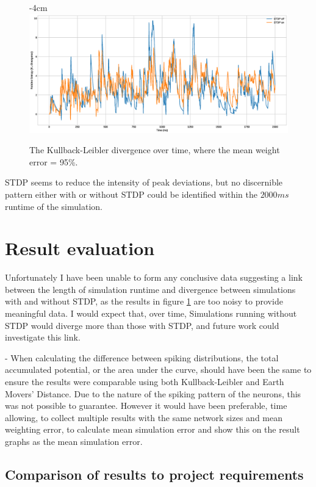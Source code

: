 \begin{figure}[h!]
    \centering
    \addtolength{\leftskip} {-4cm}
    \addtolength{\rightskip}{-4cm}
    \includegraphics[width=1.6\linewidth]{figures/graphs/RESULT2.eps}
    \caption[KL divergence over time, mean weight error = 95\%]{The Kullback-Leibler divergence over time, where the mean weight error = 95\%.}
    \label{fig:RES2}
\end{figure}
\FloatBarrier
STDP seems to reduce the intensity of peak deviations, but no discernible pattern either with or without STDP could be identified within the $2000ms$ runtime of the simulation.


\section{Result evaluation}

Unfortunately I have been unable to form any conclusive data suggesting a link
between the length of simulation runtime and divergence between simulations with
and without STDP, as the results in figure \ref{fig:RES2} are too noisy to
provide meaningful data. I would expect that, over time, Simulations running
without STDP would diverge more than those with STDP, and future work could
investigate this link.

- When calculating the difference between spiking distributions, the total
accumulated potential, or the area under
the curve, should have been the same to ensure
the results were comparable using both Kullback-Leibler and Earth Movers'
Distance. Due to the nature of the spiking pattern of the neurons, this was not
possible to guarantee. However it would have been preferable, time allowing, to
collect multiple results with the same network sizes and mean weighting error,
to calculate mean simulation error and show this on the result graphs as the
mean simulation error.

\subsection{Comparison of results to project requirements}

